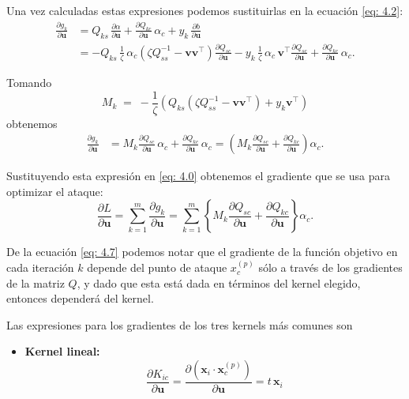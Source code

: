 \documentclass[letterpaper,12pt,oneside]{book}
\begin{document}
{{{{Una vez calculadas estas expresiones podemos sustituirlas en la ecuación \eqref{eq: 4.2}:
\begin{align*}
\frac{\partial g_k}{\partial \mathbf{u}} 
&= Q_{ks}\,\frac{\partial \alpha}{\partial \mathbf{u}} + \frac{\partial Q_{kc}}{\partial \mathbf{u}}\,\alpha_c + y_k\,\frac{\partial b}{\partial \mathbf{u}} \\[4pt]
&= - Q_{ks}\,\frac{1}{\zeta}\,\alpha_c\!\left( \zeta Q_{ss}^{-1} - \mathbf{v}\mathbf{v}^{\top}\right)\frac{\partial Q_{sc}}{\partial \mathbf{u}}
  - y_k\,\frac{1}{\zeta}\,\alpha_c\,\mathbf{v}^\top\frac{\partial Q_{sc}}{\partial \mathbf{u}}
  + \frac{\partial Q_{kc}}{\partial \mathbf{u}}\,\alpha_c.
\end{align*}

Tomando
\[
M_k \;=\; -\frac{1}{\zeta}\left( Q_{ks}\!\left( \zeta Q_{ss}^{-1} - \mathbf{v}\mathbf{v}^{\top}\right) + y_k\mathbf{v}^{\top}\right)
\]
obtenemos
\begin{align*}
\frac{\partial g_k}{\partial \mathbf{u}} 
&= M_k\frac{\partial Q_{sc}}{\partial \mathbf{u}}\,\alpha_c + \frac{\partial Q_{kc}}{\partial \mathbf{u}}\,\alpha_c
= \left(M_k\frac{\partial Q_{sc}}{\partial \mathbf{u}}  + \frac{\partial Q_{kc}}{\partial \mathbf{u}}\right)\alpha_c.
\end{align*}

Sustituyendo esta expresión en \eqref{eq: 4.0} obtenemos el gradiente que se usa para optimizar el ataque:
\begin{equation}
\frac{\partial L}{\partial \mathbf{u}} 
= \sum_{k=1}^{m} \frac{\partial g_k}{\partial \mathbf{u}}
= \sum_{k=1}^{m} \left\{ M_k \frac{\partial Q_{sc}}{\partial \mathbf{u}} + \frac{\partial Q_{kc}}{\partial \mathbf{u}} \right\} \alpha_{c}.
\label{eq: 4.7}
\end{equation}




De la ecuación \eqref{eq: 4.7} podemos notar que el gradiente de la función objetivo en cada iteración \(k\) depende del punto de ataque \(x_c^{(p)}\) sólo a través de los gradientes de la matriz \(Q\), y dado que esta está dada en términos del kernel elegido, entonces dependerá del kernel.

Las expresiones para los gradientes de los tres kernels más comunes son

\begin{itemize}
    \item \textbf{Kernel lineal:}
    \[
    \frac{\partial K_{ic}}{\partial \mathbf{u}} = \frac{\partial (\mathbf{x}_i \cdot \mathbf{x}_c^{(p)})}{\partial \mathbf{u}} = t\, \mathbf{x}_i
    \]


\end{itemize}}}}}
\end{document}
